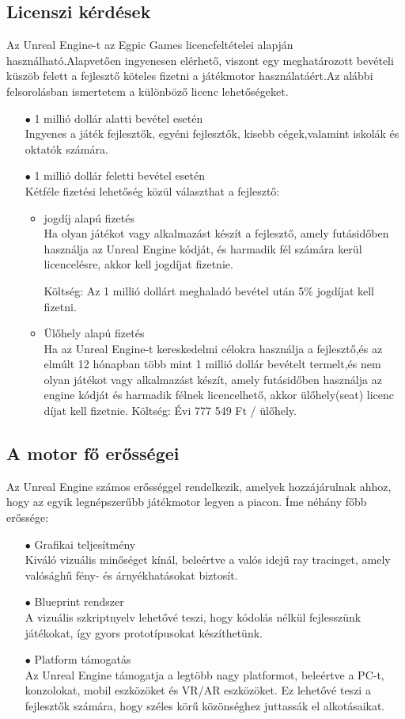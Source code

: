\documentclass[
]{thesis-ekf}
\theoremstyle{definition}
\theoremstyle{remark}
\begin{document}
\subsection{Licenszi kérdések}
Az Unreal Engine-t az Egpic Games licencfeltételei alapján használható.Alapvetően ingyenesen elérhető, viszont egy meghatározott bevételi küszöb felett a fejlesztő köteles fizetni a játékmotor használatáért.Az alábbi felsorolásban ismertetem a különböző licenc lehetőségeket.
\begin{itemize}
	\item[$\bullet$] 1 millió dollár alatti bevétel esetén \\ Ingyenes a játék fejlesztők, egyéni fejlesztők, kisebb cégek,valamint iskolák és oktatók számára.
	\item[$\bullet$]1 millió dollár feletti bevétel esetén \\  Kétféle fizetési lehetőség közül választhat a fejlesztő:
	\begin{itemize}
		\item jogdíj alapú fizetés \\Ha olyan játékot vagy alkalmazást készít a fejlesztő, amely futásidőben használja az Unreal Engine kódját, és harmadik fél számára kerül licencelésre, akkor kell jogdíjat fizetnie.
		
		Költség: Az 1 millió dollárt meghaladó bevétel után 5\% jogdíjat kell fizetni.
		\item Ülőhely alapú fizetés \\ Ha az Unreal Engine-t kereskedelmi célokra használja a fejlesztő,és az elmúlt 12 hónapban több mint 1 millió dollár bevételt termelt,és nem olyan játékot vagy alkalmazást készít, amely futásidőben használja az engine kódját és harmadik félnek licencelhető, akkor ülőhely(seat) licenc díjat kell fizetnie.
		Költség: Évi 777 549 Ft / ülőhely.
	\end{itemize}
\end{itemize}
\subsection{A motor fő erősségei}
Az Unreal Engine számos erősséggel rendelkezik, amelyek hozzájárulnak ahhoz, hogy az egyik legnépszerűbb játékmotor legyen a piacon. Íme néhány főbb erőssége:
\begin{itemize}
	\item[$\bullet$] Grafikai teljesítmény \\Kiváló vizuális minőséget kínál, beleértve a valós idejű ray tracinget, amely valósághű fény- és árnyékhatásokat biztosít.
	\item[$\bullet$] Blueprint rendszer \\ A vizuális szkriptnyelv lehetővé teszi, hogy kódolás nélkül fejlesszünk játékokat, így gyors prototípusokat készíthetünk.
	\item[$\bullet$] Platform támogatás \\Az Unreal Engine támogatja a legtöbb nagy platformot, beleértve a PC-t, konzolokat, mobil eszközöket és VR/AR eszközöket. Ez lehetővé teszi a fejlesztők számára, hogy széles körű közönséghez juttassák el alkotásaikat.
\end{itemize}
\end{document}

